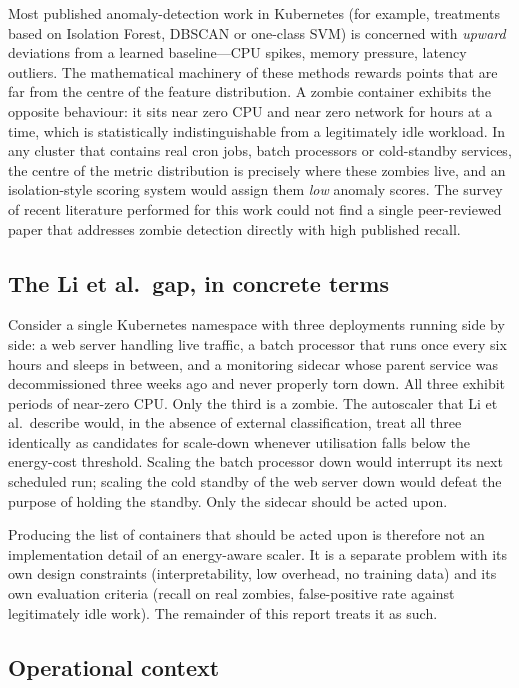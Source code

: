 \documentclass[11pt,a4paper,oneside]{article}
\begin{document}
Most published anomaly-detection work in Kubernetes (for example,
treatments based on Isolation Forest, DBSCAN or one-class SVM) is concerned
with \emph{upward} deviations from a learned baseline---CPU spikes,
memory pressure, latency outliers. The mathematical machinery of these
methods rewards points that are far from the centre of the feature
distribution. A zombie container exhibits the opposite behaviour: it sits
near zero CPU and near zero network for hours at a time, which is
statistically indistinguishable from a legitimately idle workload. In any
cluster that contains real cron jobs, batch processors or cold-standby
services, the centre of the metric distribution is precisely where these
zombies live, and an isolation-style scoring system would assign them
\emph{low} anomaly scores. The survey of recent literature performed for
this work could not find a single peer-reviewed paper that addresses
zombie detection directly with high published recall.

\subsection{The Li et al.\ gap, in concrete terms}

Consider a single Kubernetes namespace with three deployments running side
by side: a web server handling live traffic, a batch processor that runs
once every six hours and sleeps in between, and a monitoring sidecar whose
parent service was decommissioned three weeks ago and never properly torn
down. All three exhibit periods of near-zero CPU. Only the third is a
zombie. The autoscaler that Li et al.\ describe would, in the absence of
external classification, treat all three identically as candidates for
scale-down whenever utilisation falls below the energy-cost threshold.
Scaling the batch processor down would interrupt its next scheduled run;
scaling the cold standby of the web server down would defeat the purpose
of holding the standby. Only the sidecar should be acted upon.

Producing the list of containers that should be acted upon is therefore
not an implementation detail of an energy-aware scaler. It is a separate
problem with its own design constraints (interpretability, low overhead,
no training data) and its own evaluation criteria (recall on real
zombies, false-positive rate against legitimately idle work). The
remainder of this report treats it as such.

\subsection{Operational context}
\end{document}

